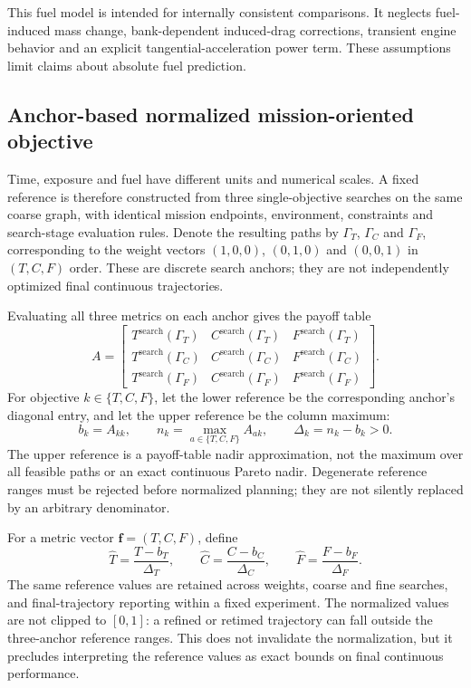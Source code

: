 \documentclass[preprint,12pt]{elsarticle}
\begin{document}
This fuel model is intended for internally consistent comparisons. It
neglects fuel-induced mass change, bank-dependent induced-drag corrections,
transient engine behavior and an explicit tangential-acceleration power
term. These assumptions limit claims about absolute fuel prediction.

\subsection{Anchor-based normalized mission-oriented objective}
\label{pr:sec:objective}
Time, exposure and fuel have different units and numerical scales. A fixed
reference is therefore constructed from three single-objective searches
on the same coarse graph, with identical mission endpoints, environment,
constraints and search-stage evaluation rules. Denote the resulting paths
by $\Gamma_T$, $\Gamma_C$ and $\Gamma_F$, corresponding to the weight
vectors $(1,0,0)$, $(0,1,0)$ and $(0,0,1)$ in $(T,C,F)$ order. These
are discrete search anchors; they are not independently optimized final
continuous trajectories.

Evaluating all three metrics on each anchor gives the payoff table
\begin{equation}
 A=\begin{bmatrix}
 T^{\mathrm{search}}(\Gamma_T)&C^{\mathrm{search}}(\Gamma_T)&F^{\mathrm{search}}(\Gamma_T)\\
 T^{\mathrm{search}}(\Gamma_C)&C^{\mathrm{search}}(\Gamma_C)&F^{\mathrm{search}}(\Gamma_C)\\
 T^{\mathrm{search}}(\Gamma_F)&C^{\mathrm{search}}(\Gamma_F)&F^{\mathrm{search}}(\Gamma_F)
 \end{bmatrix}.
 \label{pr:eq:payoff}
\end{equation}
For objective $k\in\{T,C,F\}$, let the lower reference be the corresponding
anchor's diagonal entry, and let the upper reference be the column maximum:
\begin{equation}
 b_k=A_{kk},\qquad n_k=\max_{a\in\{T,C,F\}}A_{ak},\qquad
 \Delta_k=n_k-b_k>0.
 \label{pr:eq:anchorscale}
\end{equation}
The upper reference is a payoff-table nadir approximation, not the
maximum over all feasible paths or an exact continuous Pareto nadir.
Degenerate reference ranges must be rejected before normalized planning;
they are not silently replaced by an arbitrary denominator.

For a metric vector $\mathbf{f}=(T,C,F)$, define
\begin{equation}
 \widehat T=\frac{T-b_T}{\Delta_T},\qquad
 \widehat C=\frac{C-b_C}{\Delta_C},\qquad
 \widehat F=\frac{F-b_F}{\Delta_F}.
 \label{pr:eq:normalize}
\end{equation}
The same reference values are retained across weights, coarse and fine
searches, and final-trajectory reporting within a fixed experiment.
The normalized values are not clipped to $[0,1]$: a refined or retimed
trajectory can fall outside the three-anchor reference ranges. This does
not invalidate the normalization, but it precludes interpreting the
reference values as exact bounds on final continuous performance.
\end{document}
